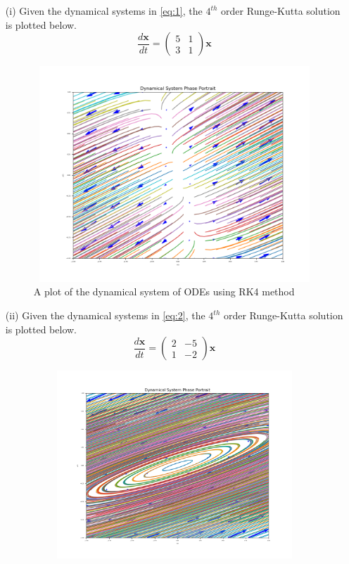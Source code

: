 \documentclass[12pt,a4paper]{article}
\begin{document}
\begin{enumerate}
		\item[(i)] Given the dynamical systems in \eqref{eq:1}, the $4^{th}$ order Runge-Kutta solution is plotted below.
				\begin{equation}
						  \frac{d\mathbf{x}}{dt} =  \begin{pmatrix}
		  								5 &  1\\
		  								3 & 1
		  						\end{pmatrix} \mathbf{x}
						\label{eq:1}
			  \end{equation}
					\begin{figure}[!h]
									\includegraphics[width=430pt,  height=230pt]{./graphics/q001_a.png}
										\caption{A plot of the dynamical system of ODEs using RK4 method}
										\label{fig:q1}
								\end{figure}
					\item[(ii)] Given the dynamical systems in \eqref{eq:2}, the $4^{th}$ order Runge-Kutta solution is plotted below.
				\begin{equation}
						  \frac{d\mathbf{x}}{dt} =  \begin{pmatrix}
		  								2 &  -5\\
		  								1  & -2
		  						\end{pmatrix} \mathbf{x}
						\label{eq:2}
			  \end{equation}
					\begin{figure}[!h]
									\includegraphics[width=430pt,  height=200pt]{./graphics/q001_b.png}

\end{figure}
\end{enumerate}
\end{document}
